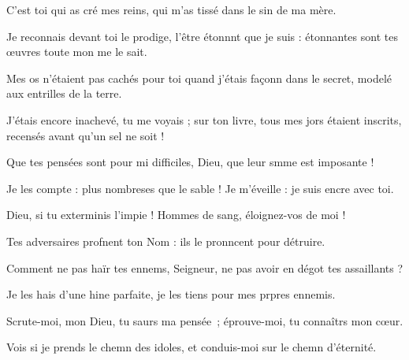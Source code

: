 \item C’est toi qui as cré mes reins, qui m’as tissé dans le sin de ma mère.
\item Je reconnais devant toi le prodige, l’être étonnnt que je suis : étonnantes sont tes œuvres toute mon me le sait.
\item Mes os n’étaient pas cachés pour toi quand j’étais façonn dans le secret, modelé aux entrilles de la terre.
\item J’étais encore inachevé, tu me voyais ; sur ton livre, tous mes jors étaient inscrits, recensés avant qu’un sel ne soit !
\item Que tes pensées sont pour mi difficiles, Dieu, que leur smme est imposante !
\item Je les compte : plus nombreses que le sable ! Je m’éveille : je suis encre avec toi.
\item Dieu, si tu exterminis l’impie ! Hommes de sang, éloignez-vos de moi !
\item Tes adversaires profnent ton Nom : ils le pronncent pour détruire.
\item Comment ne pas haïr tes ennems, Seigneur, ne pas avoir en dégot tes assaillants ?
\item Je les hais d’une hine parfaite, je les tiens pour mes prpres ennemis.
\item Scrute-moi, mon Dieu, tu saurs ma pensée ; éprouve-moi, tu connaîtrs mon cœur.
\item Vois si je prends le chemn des idoles, et conduis-moi sur le chemn d’éternité.